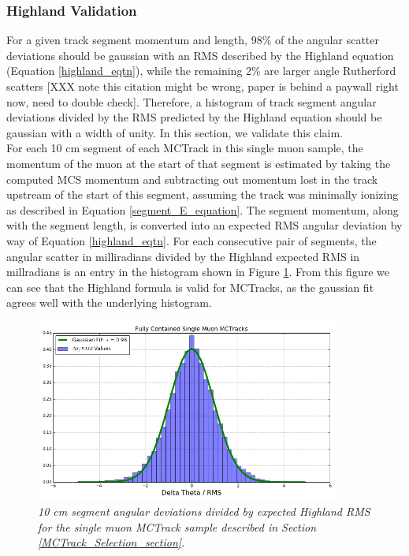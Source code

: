 \subsubsection{Highland Validation}\label{Highland_Validation_MCTrack_section}
For a given track segment momentum and length, 98\% of the angular scatter deviations should be gaussian with an RMS described by the Highland equation (Equation \ref{highland_eqtn}), while the remaining 2\% are larger angle Rutherford scatters\cite{highland} [XXX note this citation might be wrong, paper is behind a paywall right now, need to double check]. Therefore, a histogram of track segment angular deviations divided by the RMS predicted by the Highland equation should be gaussian with a width of unity. In this section, we validate this claim.\\

For each 10 cm segment of each {\sc MCTrack} in this single muon sample, the momentum of the muon at the start of that segment is estimated by taking the computed MCS momentum and subtracting out momentum lost in the track upstream of the start of this segment, assuming the track was minimally ionizing as described in Equation \ref{segment_E_equation}. The segment momentum, along with the segment length, is converted into an expected RMS angular deviation by way of Equation \ref{highland_eqtn}. For each consecutive pair of segments, the angular scatter in milliradians divided by the Highland expected RMS in millradians is an entry in the histogram shown in Figure \ref{Highland_validation_MCTracks_fig}. From this figure we can see that the Highland formula is valid for {\sc MCTracks}, as the gaussian fit agrees well with the underlying histogram.

\begin{figure}[ht!]
\begin{center}
\includegraphics[width=100mm]{Figures/Highland_validation_SingleMuonMCTrack.png}
\end{center}
\caption{\textit{10 cm segment angular deviations divided by expected Highland RMS for the single muon {\sc MCTrack} sample described in Section \ref{MCTrack_Selection_section}.}}
\label{Highland_validation_MCTracks_fig}
\end{figure}













